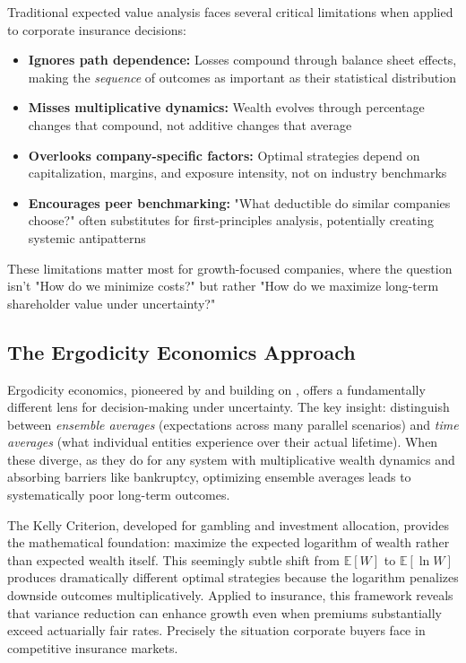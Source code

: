 \documentclass[11pt,letterpaper]{article}
\begin{document}
Traditional expected value analysis faces several critical limitations when applied to corporate insurance decisions:
\begin{itemize}
    \item \textbf{Ignores path dependence:} Losses compound through balance sheet effects, making the \emph{sequence} of outcomes as important as their statistical distribution
    \item \textbf{Misses multiplicative dynamics:} Wealth evolves through percentage changes that compound, not additive changes that average
    \item \textbf{Overlooks company-specific factors:} Optimal strategies depend on capitalization, margins, and exposure intensity, not on industry benchmarks
    \item \textbf{Encourages peer benchmarking:} "What deductible do similar companies choose?" often substitutes for first-principles analysis, potentially creating systemic antipatterns
\end{itemize}

These limitations matter most for growth-focused companies, where the question isn't "How do we minimize costs?" but rather "How do we maximize long-term shareholder value under uncertainty?"

\subsection{The Ergodicity Economics Approach}

Ergodicity economics, pioneered by \citet{peters2019ergodicity} and building on \citet{kelly1956new}, offers a fundamentally different lens for decision-making under uncertainty. The key insight: distinguish between \emph{ensemble averages} (expectations across many parallel scenarios) and \emph{time averages} (what individual entities experience over their actual lifetime). When these diverge, as they do for any system with multiplicative wealth dynamics and absorbing barriers like bankruptcy, optimizing ensemble averages leads to systematically poor long-term outcomes.

The Kelly Criterion, developed for gambling and investment allocation, provides the mathematical foundation: maximize the expected logarithm of wealth rather than expected wealth itself. This seemingly subtle shift from $\mathbb{E}[W]$ to $\mathbb{E}[\ln W]$ produces dramatically different optimal strategies because the logarithm penalizes downside outcomes multiplicatively. Applied to insurance, this framework reveals that variance reduction can enhance growth even when premiums substantially exceed actuarially fair rates. Precisely the situation corporate buyers face in competitive insurance markets.
\end{document}
